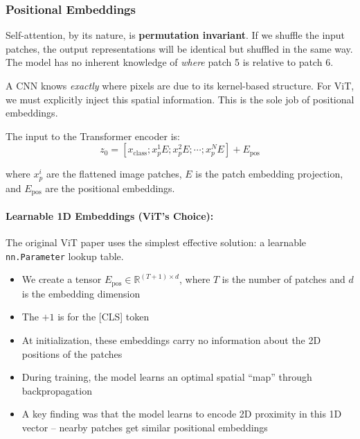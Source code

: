 \documentclass{article}
\begin{document}
\subsubsection{Positional Embeddings}

Self-attention, by its nature, is \textbf{permutation invariant}. If we shuffle the input patches, the output representations will be identical but shuffled in the same way. The model has no inherent knowledge of \textit{where} patch 5 is relative to patch 6.

A CNN knows \textit{exactly} where pixels are due to its kernel-based structure. For ViT, we must explicitly inject this spatial information. This is the sole job of positional embeddings.

The input to the Transformer encoder is:
\begin{equation}
z_0 = [x_{\text{class}}; x_p^1 E; x_p^2 E; \cdots ; x_p^N E] + E_{\text{pos}}
\end{equation}

where $x_p^i$ are the flattened image patches, $E$ is the patch embedding projection, and $E_{\text{pos}}$ are the positional embeddings.

\paragraph{Learnable 1D Embeddings (ViT's Choice):}

The original ViT paper uses the simplest effective solution: a learnable \texttt{nn.Parameter} lookup table.

\begin{itemize}
\item We create a tensor $E_{\text{pos}} \in \mathbb{R}^{(T+1) \times d}$, where $T$ is the number of patches and $d$ is the embedding dimension
\item The $+1$ is for the [CLS] token
\item At initialization, these embeddings carry no information about the 2D positions of the patches
\item During training, the model learns an optimal spatial ``map'' through backpropagation
\item A key finding was that the model learns to encode 2D proximity in this 1D vector -- nearby patches get similar positional embeddings
\end{itemize}
\end{document}
